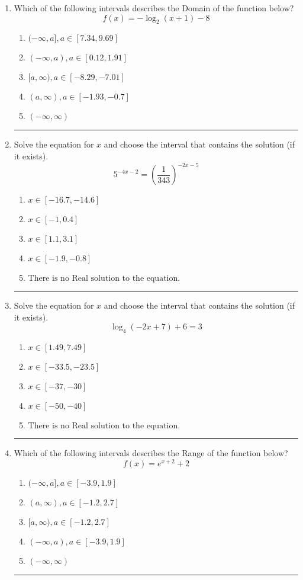 \documentclass[14pt]{extbook}
\newcommand{\litem}[1]{\item#1\hspace*{-1cm}\rule{\textwidth}{0.4pt}}
\begin{document}
\begin{enumerate}
\litem{
Which of the following intervals describes the Domain of the function below?\[ f(x) = -\log_2{(x+1)}-8 \]\begin{enumerate}[label=\Alph*.]
\item \( (-\infty, a], a \in [7.34, 9.69] \)
\item \( (-\infty, a), a \in [0.12, 1.91] \)
\item \( [a, \infty), a \in [-8.29, -7.01] \)
\item \( (a, \infty), a \in [-1.93, -0.7] \)
\item \( (-\infty, \infty) \)

\end{enumerate} }
\litem{
Solve the equation for $x$ and choose the interval that contains the solution (if it exists).\[ 5^{-4x-2} = \left(\frac{1}{343}\right)^{-2x-5} \]\begin{enumerate}[label=\Alph*.]
\item \( x \in [-16.7, -14.6] \)
\item \( x \in [-1, 0.4] \)
\item \( x \in [1.1, 3.1] \)
\item \( x \in [-1.9, -0.8] \)
\item \( \text{There is no Real solution to the equation.} \)

\end{enumerate} }
\litem{
Solve the equation for $x$ and choose the interval that contains the solution (if it exists).\[ \log_{4}{(-2x+7)}+6 = 3 \]\begin{enumerate}[label=\Alph*.]
\item \( x \in [1.49, 7.49] \)
\item \( x \in [-33.5, -23.5] \)
\item \( x \in [-37, -30] \)
\item \( x \in [-50, -40] \)
\item \( \text{There is no Real solution to the equation.} \)

\end{enumerate} }
\litem{
Which of the following intervals describes the Range of the function below?\[ f(x) = e^{x+2}+2 \]\begin{enumerate}[label=\Alph*.]
\item \( (-\infty, a], a \in [-3.9, 1.9] \)
\item \( (a, \infty), a \in [-1.2, 2.7] \)
\item \( [a, \infty), a \in [-1.2, 2.7] \)
\item \( (-\infty, a), a \in [-3.9, 1.9] \)
\item \( (-\infty, \infty) \)


\end{enumerate}}
\end{enumerate}
\end{document}
